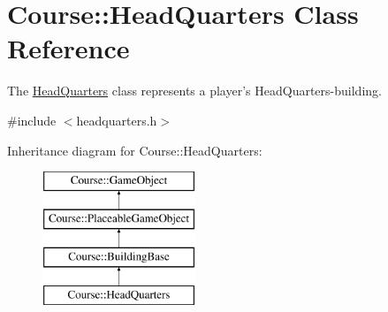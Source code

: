 \hypertarget{classCourse_1_1HeadQuarters}{\section{Course\-:\-:Head\-Quarters Class Reference}
\label{classCourse_1_1HeadQuarters}
}


The \hyperlink{classCourse_1_1HeadQuarters}{Head\-Quarters} class represents a player's Head\-Quarters-\/building.  




{\ttfamily \#include $<$headquarters.\-h$>$}

Inheritance diagram for Course\-:\-:Head\-Quarters\-:\begin{figure}[H]
\begin{center}
\leavevmode
\includegraphics[height=4.000000cm]{classCourse_1_1HeadQuarters}
\end{center}
\end{figure}
